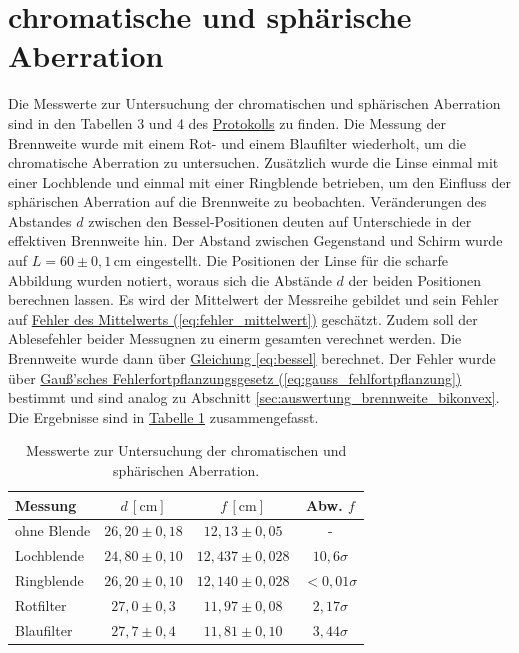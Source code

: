 \section{chromatische und sphärische Aberration}
\label{sec:auswertung_aberration}
Die Messwerte zur Untersuchung der chromatischen und sphärischen Aberration sind in den Tabellen 3 und 4 des \hyperref[Protokoll]{Protokolls} zu finden. Die Messung der Brennweite wurde mit einem Rot- und einem Blaufilter wiederholt, um die chromatische Aberration zu untersuchen. Zusätzlich wurde die Linse einmal mit einer Lochblende und einmal mit einer Ringblende betrieben, um den Einfluss der sphärischen Aberration auf die Brennweite zu beobachten. Veränderungen des Abstandes $d$ zwischen den Bessel-Positionen deuten auf Unterschiede in der effektiven Brennweite hin. Der Abstand zwischen Gegenstand und Schirm wurde auf $L = 60 \pm 0{,}1\,\mathrm{cm}$ eingestellt. Die Positionen der Linse für die scharfe Abbildung wurden notiert, woraus sich die Abstände $d$ der beiden Positionen berechnen lassen. Es wird der Mittelwert der Messreihe gebildet und sein Fehler auf \hyperref[eq:fehler_mittelwert]{Fehler des Mittelwerts (\ref*{eq:fehler_mittelwert})} geschätzt. Zudem soll der Ablesefehler beider Messugnen zu einerm gesamten verechnet werden. Die Brennweite wurde dann über \hyperref[eq:bessel]{Gleichung \ref*{eq:bessel}} berechnet. Der Fehler wurde über \hyperref[eq:gauss_fehlfortpflanzung]{Gauß'sches Fehlerfortpflanzungsgesetz (\ref*{eq:gauss_fehlfortpflanzung})} bestimmt und sind analog zu Abschnitt \ref{sec:auswertung_brennweite_bikonvex}. 
Die Ergebnisse sind in \hyperref[tab:messwerte_aberration]{Tabelle \ref*{tab:messwerte_aberration}} zusammengefasst.
\begin{table}[!ht]
    \centering
    \begin{tabular}{l | c c | c}
        \hline
        Messung & $d \,[\mathrm{cm}]$ & $f \,[\mathrm{cm}]$ & Abw. $f$ \\
        \hline
        ohne Blende & $26{,}20 \pm 0{,}18$ & $12{,}13 \pm 0{,}05$ & - \\
        \midrule
        Lochblende & $24{,}80 \pm 0{,}10$ & $12{,}437 \pm 0{,}028$ & $10,6\sigma$ \\
        Ringblende & $26{,}20 \pm 0{,}10$ & $12{,}140 \pm 0{,}028$ & $ < 0,01\sigma$ \\
        \midrule
        Rotfilter & $27{,}0 \pm 0{,}3$ & $11{,}97 \pm 0{,}08$ & $2,17\sigma$ \\
        Blaufilter & $27{,}7 \pm 0{,}4$ & $11{,}81 \pm 0{,}10$ & $3,44\sigma$ \\
        \hline
    \end{tabular}
    \caption{Messwerte zur Untersuchung der chromatischen und sphärischen Aberration.}
    \label{tab:messwerte_aberration}
\end{table}

